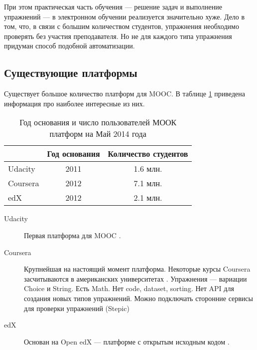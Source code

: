 \documentclass{matmex-diploma-custom}
\begin{document}
При этом практическая часть обучения --- решение задач и выполнение
упражнений --- в электронном обучении реализуется значительно хуже.
Дело в том, что, в связи с большим количеством студентов, упражнения
необходимо проверять без участия преподавателя. Но не для каждого типа
упражнения придуман способ подобной автоматизации.

\subsection*{Существующие платформы}

Существует большое количество платформ для MOOC. В таблице
\ref{table:platforms} приведена информация про наиболее интересные из
них.

\begin{table}[t]
  \centering
\begin{tabular}{|l|c|c|}
\hline
 & Год основания & Количество студентов \\
\hline
Udacity & 2011 & 1.6 млн. \\
Coursera & 2012 & 7.1 млн. \\
edX & 2012 & 2.1 млн. \\
\hline
\end{tabular}
  \caption{Год основания и число пользователей МООК платформ на Май
    2014 года}
   \label{table:platforms}
\end{table}

\iffalse
#+ORGTBL: SEND plat orgtbl-to-latex :splice nil :skip 0
|----------+---------------+----------------------------------|
|          | Год основания | Количество студентов             |
|----------+---------------+----------------------------------|
| Udacity  |          2011 | 1.6 млн.                         |
| Coursera |          2012 | 7.1 млн.                         |
| edX      |          2012 | 2.1 млн.                         |
|----------+---------------+----------------------------------|
\fi

\begin{description}
\item[Udacity] Первая платформа для MOOC \cite{udacity}.
\item[Coursera] Крупнейшая на настоящий момент
  платформа. Некоторые курсы Coursera засчитываются в американских
  университетах \cite{coursera}. Упражнения --- вариации Choice и
  String. Есть Math. Нет code, dataset, sorting. Нет API для создания
  новых типов упражнений. Можно подключать сторонние сервисы для
  проверки упражнений (Stepic)
\item[edX] Основан на Open edX --- платформе с открытым исходным кодом
  \cite{edx}.
\end{description}
\end{document}
